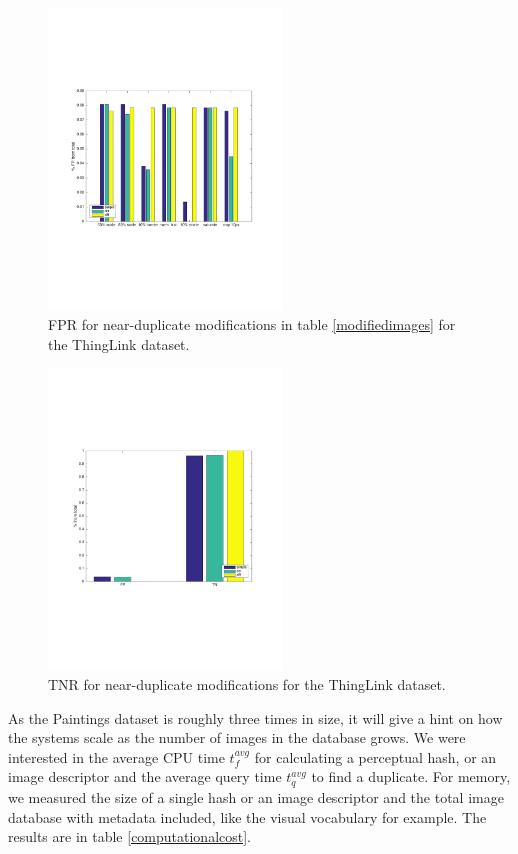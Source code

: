 \documentclass[english,12pt,a4paper,pdftex,elec,utf8, table]{aaltothesis}
\begin{document}
\begin{figure}[htb]
\begin{center}
\includegraphics[height=8cm]{figures/thinglink_fpBar}
\end{center}
\caption{ FPR for near-duplicate modifications in table \ref{modifiedimages} for the ThingLink dataset.}
\label{thinglinkfptotal}
\end{figure}

\begin{figure}[htb]
\begin{center}
\includegraphics[height=8cm]{figures/thinglink_tnBar}
\end{center}
\caption{ TNR for near-duplicate modifications for the ThingLink dataset.}
\label{thinglinktntotal}
\end{figure}

As the Paintings dataset is roughly three times in size, it will give a hint on how the systems scale as the number of images in the database grows. We were interested in the average CPU time $t_f^{avg}$ for calculating a perceptual hash, or an image descriptor and the average query time $t_q^{avg}$ to find a duplicate. For memory, we measured the size of a single hash or an image descriptor and the total image database with metadata included, like the visual vocabulary for example. The results are in table \ref{computationalcost}.
\end{document}
